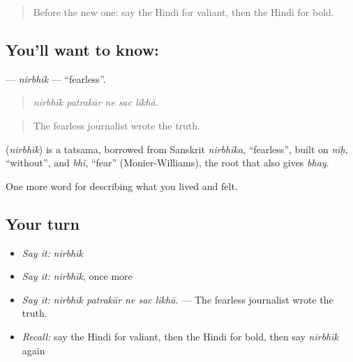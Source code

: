 \label{lesson:HI-C470-nirbhik}



\begin{quote}
Before the new one: say the Hindi for valiant, then the Hindi for bold.
\end{quote}

\subsection*{You'll want to know: }
\textbf{} — \emph{nirbhīk} — \textquotedblleft{}fearless\textquotedblright{}.

\begin{quote}
    
\end{quote}

\begin{quote}
\emph{nirbhīk patrakār ne sac likhā.}
\end{quote}

\begin{quote}
The fearless journalist wrote the truth.
\end{quote}

\begin{cousinweb}
\textbf{} (\emph{nirbhīk}) is a tatsama, borrowed from Sanskrit \emph{nirbhīka}, \textquotedblleft{}fearless\textquotedblright{}, built on \emph{niḥ}, \textquotedblleft{}without\textquotedblright{}, and \emph{bhī}, \textquotedblleft{}fear\textquotedblright{} (Monier-Williams), the root that also gives \emph{bhay}.
\end{cousinweb}

\begin{grammarlens}[title={What you've built}]
One more word for describing what you lived and felt.
\end{grammarlens}

\subsection*{Your turn}
\begin{itemize}
\raggedright
  \item \emph{Say it:} \emph{nirbhīk}
  \item \emph{Say it:} \emph{nirbhīk}, once more
  \item \emph{Say it:} \emph{nirbhīk patrakār ne sac likhā.} — The fearless journalist wrote the truth.
  \item \emph{Recall:} say the Hindi for valiant, then the Hindi for bold, then say \emph{nirbhīk} again
\end{itemize}

